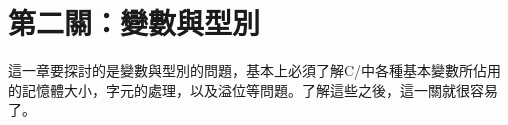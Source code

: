 \chapter{第二關：變數與型別}
這一章要探討的是變數與型別的問題，基本上必須了解C/\cc{}中各種基本變數所佔用的記憶體大小，字元的處理，以及溢位等問題。了解這些之後，這一關就很容易了。






